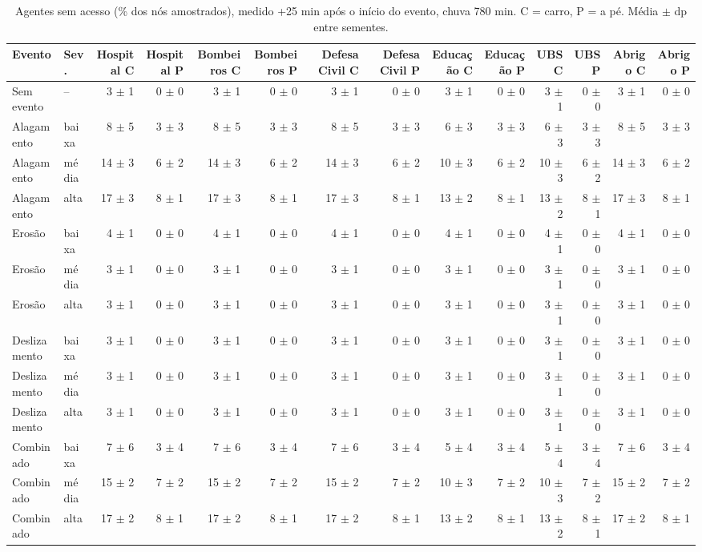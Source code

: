 \begin{table}[htbp]
\centering
\tiny
\caption{Agentes sem acesso (\% dos nós amostrados), medido +25 min após o início do evento, chuva 780 min. C = carro, P = a pé. Média $\pm$ dp entre sementes.}
\label{tab:t4_25min_780}
\begin{tabular}{llrrrrrrrrrrrr}
\toprule
Evento & Sev. & Hospital C & Hospital P & Bombeiros C & Bombeiros P & Defesa Civil C & Defesa Civil P & Educação C & Educação P & UBS C & UBS P & Abrigo C & Abrigo P \\
\midrule
Sem evento & -- & 3 $\pm$ 1 & 0 $\pm$ 0 & 3 $\pm$ 1 & 0 $\pm$ 0 & 3 $\pm$ 1 & 0 $\pm$ 0 & 3 $\pm$ 1 & 0 $\pm$ 0 & 3 $\pm$ 1 & 0 $\pm$ 0 & 3 $\pm$ 1 & 0 $\pm$ 0 \\
Alagamento & baixa & 8 $\pm$ 5 & 3 $\pm$ 3 & 8 $\pm$ 5 & 3 $\pm$ 3 & 8 $\pm$ 5 & 3 $\pm$ 3 & 6 $\pm$ 3 & 3 $\pm$ 3 & 6 $\pm$ 3 & 3 $\pm$ 3 & 8 $\pm$ 5 & 3 $\pm$ 3 \\
Alagamento & média & 14 $\pm$ 3 & 6 $\pm$ 2 & 14 $\pm$ 3 & 6 $\pm$ 2 & 14 $\pm$ 3 & 6 $\pm$ 2 & 10 $\pm$ 3 & 6 $\pm$ 2 & 10 $\pm$ 3 & 6 $\pm$ 2 & 14 $\pm$ 3 & 6 $\pm$ 2 \\
Alagamento & alta & 17 $\pm$ 3 & 8 $\pm$ 1 & 17 $\pm$ 3 & 8 $\pm$ 1 & 17 $\pm$ 3 & 8 $\pm$ 1 & 13 $\pm$ 2 & 8 $\pm$ 1 & 13 $\pm$ 2 & 8 $\pm$ 1 & 17 $\pm$ 3 & 8 $\pm$ 1 \\
Erosão & baixa & 4 $\pm$ 1 & 0 $\pm$ 0 & 4 $\pm$ 1 & 0 $\pm$ 0 & 4 $\pm$ 1 & 0 $\pm$ 0 & 4 $\pm$ 1 & 0 $\pm$ 0 & 4 $\pm$ 1 & 0 $\pm$ 0 & 4 $\pm$ 1 & 0 $\pm$ 0 \\
Erosão & média & 3 $\pm$ 1 & 0 $\pm$ 0 & 3 $\pm$ 1 & 0 $\pm$ 0 & 3 $\pm$ 1 & 0 $\pm$ 0 & 3 $\pm$ 1 & 0 $\pm$ 0 & 3 $\pm$ 1 & 0 $\pm$ 0 & 3 $\pm$ 1 & 0 $\pm$ 0 \\
Erosão & alta & 3 $\pm$ 1 & 0 $\pm$ 0 & 3 $\pm$ 1 & 0 $\pm$ 0 & 3 $\pm$ 1 & 0 $\pm$ 0 & 3 $\pm$ 1 & 0 $\pm$ 0 & 3 $\pm$ 1 & 0 $\pm$ 0 & 3 $\pm$ 1 & 0 $\pm$ 0 \\
Deslizamento & baixa & 3 $\pm$ 1 & 0 $\pm$ 0 & 3 $\pm$ 1 & 0 $\pm$ 0 & 3 $\pm$ 1 & 0 $\pm$ 0 & 3 $\pm$ 1 & 0 $\pm$ 0 & 3 $\pm$ 1 & 0 $\pm$ 0 & 3 $\pm$ 1 & 0 $\pm$ 0 \\
Deslizamento & média & 3 $\pm$ 1 & 0 $\pm$ 0 & 3 $\pm$ 1 & 0 $\pm$ 0 & 3 $\pm$ 1 & 0 $\pm$ 0 & 3 $\pm$ 1 & 0 $\pm$ 0 & 3 $\pm$ 1 & 0 $\pm$ 0 & 3 $\pm$ 1 & 0 $\pm$ 0 \\
Deslizamento & alta & 3 $\pm$ 1 & 0 $\pm$ 0 & 3 $\pm$ 1 & 0 $\pm$ 0 & 3 $\pm$ 1 & 0 $\pm$ 0 & 3 $\pm$ 1 & 0 $\pm$ 0 & 3 $\pm$ 1 & 0 $\pm$ 0 & 3 $\pm$ 1 & 0 $\pm$ 0 \\
Combinado & baixa & 7 $\pm$ 6 & 3 $\pm$ 4 & 7 $\pm$ 6 & 3 $\pm$ 4 & 7 $\pm$ 6 & 3 $\pm$ 4 & 5 $\pm$ 4 & 3 $\pm$ 4 & 5 $\pm$ 4 & 3 $\pm$ 4 & 7 $\pm$ 6 & 3 $\pm$ 4 \\
Combinado & média & 15 $\pm$ 2 & 7 $\pm$ 2 & 15 $\pm$ 2 & 7 $\pm$ 2 & 15 $\pm$ 2 & 7 $\pm$ 2 & 10 $\pm$ 3 & 7 $\pm$ 2 & 10 $\pm$ 3 & 7 $\pm$ 2 & 15 $\pm$ 2 & 7 $\pm$ 2 \\
Combinado & alta & 17 $\pm$ 2 & 8 $\pm$ 1 & 17 $\pm$ 2 & 8 $\pm$ 1 & 17 $\pm$ 2 & 8 $\pm$ 1 & 13 $\pm$ 2 & 8 $\pm$ 1 & 13 $\pm$ 2 & 8 $\pm$ 1 & 17 $\pm$ 2 & 8 $\pm$ 1 \\
\bottomrule
\end{tabular}
\end{table}
